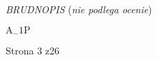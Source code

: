 \documentclass[a4paper,12pt]{article}
\begin{document}
{\it BRUDNOPIS} ({\it nie podlega ocenie})

$\mathrm{A}_{-}1\mathrm{P}$

Strona 3 z26
\end{document}
